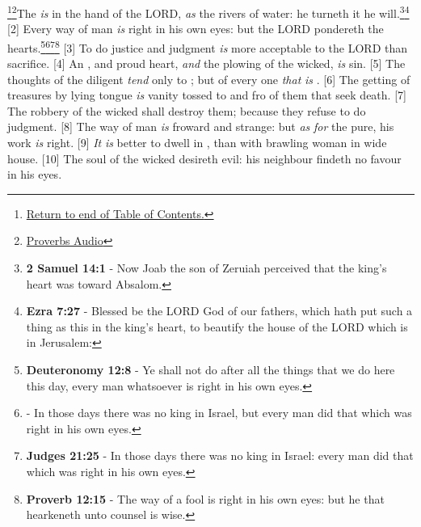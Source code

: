 \footnote{\textcolor[cmyk]{0.99998,1,0,0}{\hyperlink{TOC}{Return to end of Table of Contents.}}}\footnote{\href{https://audiobible.com/bible/proverbs_21.html}{\textcolor[cmyk]{0.99998,1,0,0}{Proverbs Audio}}}\textcolor[cmyk]{0.99998,1,0,0}{The  \emph{is} in the hand of the LORD, \emph{as} the rivers of water: he turneth it  he will.}\footnote{\textbf{2 Samuel 14:1} - Now Joab the son of Zeruiah perceived that the king’s heart was toward Absalom.}\footnote{\textbf{Ezra 7:27} - Blessed be the LORD God of our fathers, which hath put such a thing as this in the king’s heart, to beautify the house of the LORD which is in Jerusalem:}
[2] \textcolor[cmyk]{0.99998,1,0,0}{Every way of   man \emph{is} right in his own eyes: but the LORD pondereth the hearts.}\footnote{\textbf{Deuteronomy 12:8} - Ye shall not do after all the things that we do here this day, every man whatsoever is right in his own eyes.}\footnote{ - In those days there was no king in Israel, but every man did that which was right in his own eyes.}\footnote{\textbf{Judges 21:25} - In those days there was no king in Israel: every man did that which was right in his own eyes.}\footnote{\textbf{Proverb 12:15} - The way of a fool is right in his own eyes: but he that hearkeneth unto counsel is wise.}
[3] \textcolor[cmyk]{0.99998,1,0,0}{To do justice and judgment \emph{is} more acceptable to the LORD than sacrifice.}
[4] \textcolor[cmyk]{0.99998,1,0,0}{An , and   proud heart, \emph{and} the plowing of the wicked, \emph{is} sin.}
[5] \textcolor[cmyk]{0.99998,1,0,0}{The thoughts of the diligent \emph{tend} only to ; but of every one \emph{that} \emph{is} .}
[6] \textcolor[cmyk]{0.99998,1,0,0}{The getting of treasures by   lying tongue \emph{is}   vanity tossed to and fro of them that seek death.}
[7] \textcolor[cmyk]{0.99998,1,0,0}{The robbery of the wicked shall destroy them; because they refuse to do judgment.}
[8] \textcolor[cmyk]{0.99998,1,0,0}{The way of man \emph{is} froward and strange: but \emph{as} \emph{for} the pure, his work \emph{is} right.}
[9] \textcolor[cmyk]{0.99998,1,0,0}{\emph{It} \emph{is} better to dwell in   , than with   brawling woman in  wide house.}
[10] \textcolor[cmyk]{0.99998,1,0,0}{The soul of the wicked desireth evil: his neighbour findeth no favour in his eyes.}

